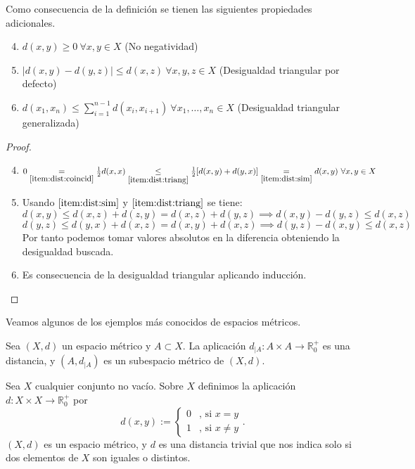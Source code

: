 \begin{remark}
    Como consecuencia de la definición se tienen las siguientes propiedades adicionales.
    \begin{enumerate}
        \setcounter{enumi}{3}
        \item $d(x,y) \ge 0 \ \forall x,y \in X$ (No negatividad) \label{item:dist:no_neg}
        \item $|d(x,y)-d(y,z)| \le d(x,z) \ \forall x,y,z \in X$ (Desigualdad triangular por defecto) \label{item:dist:triang_def}
        \item $d(x_1,x_n) \le \sum_{i=1}^{n-1}d(x_i,x_{i+1}) \ \forall x_1,\dots,x_n \in X$ (Desigualdad triangular generalizada) \label{item:dist:triang_gen}
    \end{enumerate}
\end{remark}

\begin{proof}
    $ $ \newline
    \begin{enumerate}
        \setcounter{enumi}{3}
        \item $ 0 \underset{\ref{item:dist:coincid}}{=} \frac{1}{2}d(x,x) \underset{\ref{item:dist:triang}}{\le}\frac{1}{2}[d(x,y)+d(y,x)]\underset{\ref{item:dist:sim}}{=}d(x,y) \ \forall x,y \in X$
        
        \item Usando $\ref{item:dist:sim}$ y $\ref{item:dist:triang}$ se tiene:
        \[d(x,y) \le d(x,z) + d(z,y) = d(x,z)+d(y,z) \implies d(x,y)-d(y,z)\le d(x,z)\]
        \[d(y,z) \le d(y,x) + d(x,z) = d(x,y)+d(x,z) \implies d(y,z)-d(x,y)\le d(x,z) \]
        Por tanto podemos tomar valores absolutos en la diferencia obteniendo la desigualdad buscada.
        
        \item Es consecuencia de la desigualdad triangular aplicando inducción.
    \end{enumerate}
\end{proof}

Veamos algunos de los ejemplos más conocidos de espacios métricos.

\begin{example}
Sea $(X,d)$ un espacio métrico y $A\subset X$. La aplicación $d_{|A}:A\times A \to \mathbb{R}^+_0$ es una distancia, y $(A,d_{|A})$ es un subespacio métrico de $(X,d)$.
\end{example}

\begin{example}
    Sea $X$ cualquier conjunto no vacío. Sobre $X$ definimos la aplicación $d:X\times X \to \mathbb{R}^+_0$ por
    \[d(x,y):= \begin{cases}
    0 & \text{, si } x = y \\
    1 & \text{, si } x \ne y
    \end{cases}.\]
    $(X,d)$ es un espacio métrico, y $d$ es una distancia trivial que nos indica solo si dos elementos de $X$ son iguales o distintos.
\end{example}

